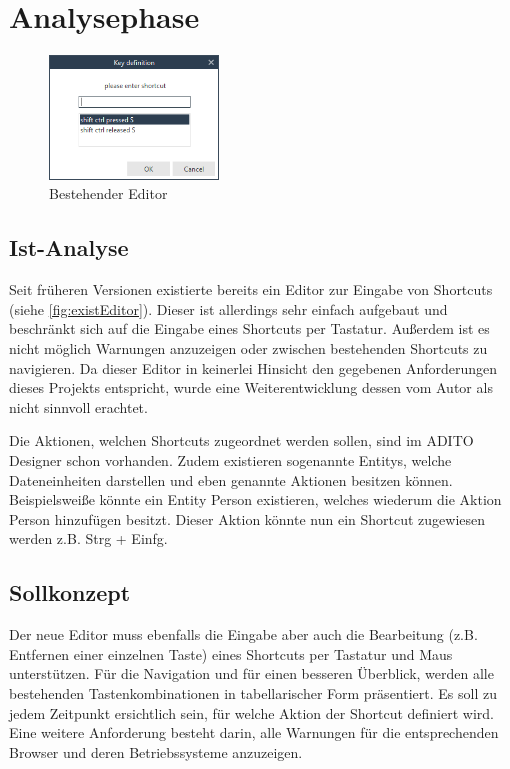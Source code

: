 \section{Analysephase}

\begin{figure}
	\vspace{-12px}
	\centering
	\includegraphics[width=170px]{../graphic/images/screenshots/Alter-Editor}
	\caption{Bestehender Editor}
	\label{fig:existEditor}
\end{figure}

\subsection{Ist-Analyse}

Seit früheren Versionen existierte bereits ein Editor zur Eingabe von Shortcuts (siehe \autoref{fig:existEditor}). Dieser ist allerdings sehr einfach aufgebaut und beschränkt sich auf die Eingabe eines Shortcuts per Tastatur. Außerdem ist es nicht möglich Warnungen anzuzeigen oder zwischen bestehenden Shortcuts zu navigieren. Da dieser Editor in keinerlei Hinsicht den gegebenen Anforderungen dieses Projekts entspricht, wurde eine Weiterentwicklung dessen vom Autor als nicht sinnvoll erachtet.

Die Aktionen, welchen Shortcuts zugeordnet werden sollen, sind im ADITO Designer schon vorhanden. Zudem existieren sogenannte Entitys, welche Dateneinheiten darstellen und eben genannte Aktionen besitzen können. Beispielsweiße könnte ein Entity \glqq Person\grqq\xspace existieren, welches wiederum die Aktion \glqq Person hinzufügen\grqq\xspace besitzt. Dieser Aktion könnte nun ein Shortcut zugewiesen werden z.B. Strg + Einfg.

\subsection{Sollkonzept}

Der neue Editor muss ebenfalls die Eingabe aber auch die Bearbeitung (z.B. Entfernen einer einzelnen Taste) eines Shortcuts per Tastatur und Maus unterstützen. Für die Navigation und für einen besseren Überblick, werden alle bestehenden Tastenkombinationen in tabellarischer Form präsentiert. Es soll zu jedem Zeitpunkt ersichtlich sein, für welche Aktion der Shortcut definiert wird. Eine weitere Anforderung besteht darin, alle Warnungen für die entsprechenden Browser und deren Betriebssysteme anzuzeigen.

